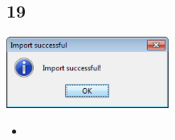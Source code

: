 \documentclass{beamer}
\begin{document}
\subsection{19}
\begin{frame}
	\begin{center}
  		\includegraphics[width=0.4\textwidth]{19.png}
	\end{center}
	\begin{itemize}
		\item
	\end{itemize}
\end{frame}
\end{document}
